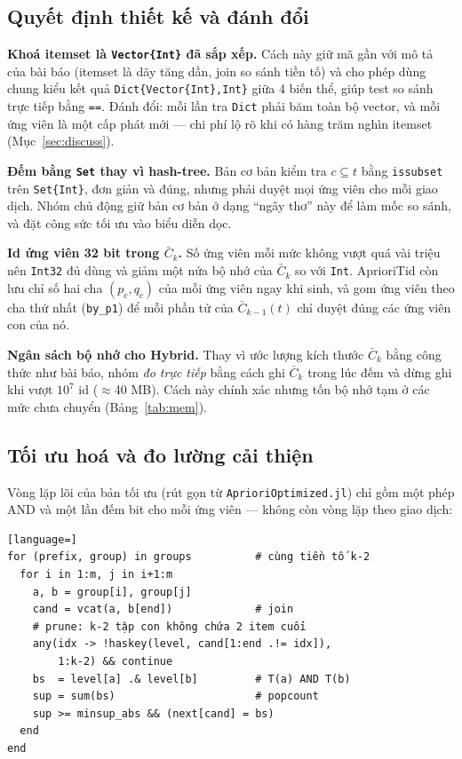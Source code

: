 \documentclass[10pt,twocolumn,letterpaper]{article}
\begin{document}
\subsection{Quyết định thiết kế và đánh đổi}
\textbf{Khoá itemset là \texttt{Vector\{Int\}} đã sắp xếp.} Cách này giữ mã gần với mô tả của bài báo (itemset là dãy tăng dần, join so sánh tiền tố) và cho phép dùng chung kiểu kết quả \texttt{Dict\{Vector\{Int\},Int\}} giữa 4 biến thể, giúp test so sánh trực tiếp bằng \texttt{==}. Đánh đổi: mỗi lần tra \texttt{Dict} phải băm toàn bộ vector, và mỗi ứng viên là một cấp phát mới — chi phí lộ rõ khi có hàng trăm nghìn itemset (Mục~\ref{sec:discuss}).

\textbf{Đếm bằng \texttt{Set} thay vì hash-tree.} Bản cơ bản kiểm tra $c\subseteq t$ bằng \texttt{issubset} trên \texttt{Set\{Int\}}, đơn giản và đúng, nhưng phải duyệt mọi ứng viên cho mỗi giao dịch. Nhóm chủ động giữ bản cơ bản ở dạng ``ngây thơ'' này để làm mốc so sánh, và đặt công sức tối ưu vào biểu diễn dọc.

\textbf{Id ứng viên 32 bit trong $\bar{C}_k$.} Số ứng viên mỗi mức không vượt quá vài triệu nên \texttt{Int32} đủ dùng và giảm một nửa bộ nhớ của $\bar{C}_k$ so với \texttt{Int}. AprioriTid còn lưu chỉ số hai cha $(p_c,q_c)$ của mỗi ứng viên ngay khi sinh, và gom ứng viên theo cha thứ nhất (\texttt{by\_p1}) để mỗi phần tử của $\bar{C}_{k-1}(t)$ chỉ duyệt đúng các ứng viên con của nó.

\textbf{Ngân sách bộ nhớ cho Hybrid.} Thay vì ước lượng kích thước $\bar{C}_k$ bằng công thức như bài báo, nhóm \emph{đo trực tiếp} bằng cách ghi $\bar{C}_k$ trong lúc đếm và dừng ghi khi vượt $10^7$ id ($\approx$40 MB). Cách này chính xác nhưng tốn bộ nhớ tạm ở các mức chưa chuyển (Bảng~\ref{tab:mem}).

\subsection{Tối ưu hoá và đo lường cải thiện}
Vòng lặp lõi của bản tối ưu (rút gọn từ \texttt{AprioriOptimized.jl}) chỉ gồm một phép AND và một lần đếm bit cho mỗi ứng viên — không còn vòng lặp theo giao dịch:
\begin{lstlisting}[language=]
for (prefix, group) in groups          # cùng tiền tố k-2
  for i in 1:m, j in i+1:m
    a, b = group[i], group[j]
    cand = vcat(a, b[end])             # join
    # prune: k-2 tập con không chứa 2 item cuối
    any(idx -> !haskey(level, cand[1:end .!= idx]),
        1:k-2) && continue
    bs  = level[a] .& level[b]         # T(a) AND T(b)
    sup = sum(bs)                      # popcount
    sup >= minsup_abs && (next[cand] = bs)
  end
end
\end{lstlisting}
\end{document}
